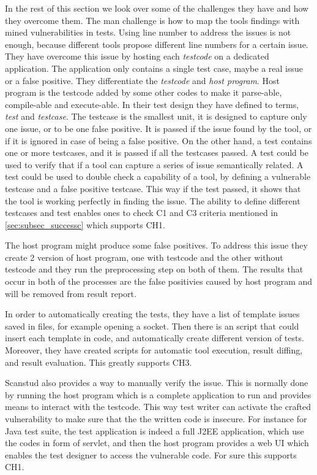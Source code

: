 \documentclass[authoryear,preprint]{sigplanconf}
\begin{document}
In the rest of this section we look over some of the challenges they have and how they overcome them. The man challenge is how to map the tools findings with mined vulnerabilities in tests. Using line number to address the issues is not enough, because different tools propose different line numbers for a certain issue. They have overcome this issue by hosting each \textit{testcode} on a dedicated application. The application only contains a single test case, maybe a real issue or a false positive. They differentiate the \textit{testcode} and \textit{host program}. Host program is the testcode added by some other codes to make it parse-able, compile-able and execute-able. In their test design they have defined to terms, \textit{test} and \textit{testcase}. The testcase is the smallest unit, it is designed to capture only one issue, or to be one false positive. It is passed if the issue found by the tool, or if it is ignored in case of being a false positive. On the other hand, a test contains one or more testcases, and it is passed if all the testcases passed. A test could be used to verify that if a tool can capture a series of issue semantically related. A test could be used to double check a capability of a tool, by defining a vulnerable testcase and a false positive testcase. This way if the test passed, it shows that the tool is working perfectly in finding the issue. The ability to define different testcases and test enables ones to check C1 and C3 criteria mentioned in \ref{sec:subsec_successc} which supports CH1.

The host program might produce some false positives. To address this issue they create 2 version of host program, one with testcode and the other without testcode and they run the preprocessing step on both of them. The results that occur in both of the processes are the false positivies caused by host program and will be removed from result report. 

In order to automatically creating the tests, they have a list of template issues saved in files, for example opening a socket. Then there is an script that could insert each template in code, and automatically create different version of tests. Moreover, they have created scripts for automatic tool execution, result diffing, and result evaluation. This greatly supports CH3.

Scanstud also provides a way to manually verify the issue. This is normally done by running the host program which is a complete application to run and provides means to interact with the testcode. This way test writer can activate the crafted vulnerability to make sure that the the written code is insecure. For instance for Java test suite, the test application is indeed a full J2EE application, which use the codes in form of servlet, and then the host program provides a web UI which enables the test designer to access the vulnerable code. For sure this supports CH1.
\end{document}
